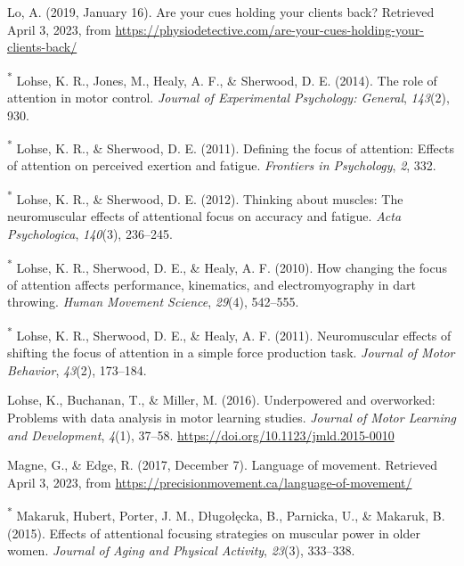 \documentclass[
  man, donotrepeattitle,floatsintext]{apa7}
\newlength{\cslhangindent}
\newlength{\cslentryspacingunit} %
\newenvironment{CSLReferences}[2] %
 {%
  \setlength{\parindent}{0pt}
  \ifodd #1
  \let\oldpar\par
  \def\par{\hangindent=\cslhangindent\oldpar}
  \fi
  \setlength{\parskip}{#2\cslentryspacingunit}
 }%
 {}
\begin{document}
\begin{CSLReferences}{1}{0}
\leavevmode{}%
Lo, A. (2019, January 16). Are your cues holding your clients back? Retrieved April 3, 2023, from \url{https://physiodetective.com/are-your-cues-holding-your-clients-back/}

\leavevmode{}%
\textsuperscript{*} Lohse, K. R., Jones, M., Healy, A. F., \& Sherwood, D. E. (2014). The role of attention in motor control. \emph{Journal of Experimental Psychology: General}, \emph{143}(2), 930.

\leavevmode{}%
\textsuperscript{*} Lohse, K. R., \& Sherwood, D. E. (2011). Defining the focus of attention: Effects of attention on perceived exertion and fatigue. \emph{Frontiers in Psychology}, \emph{2}, 332.

\leavevmode{}%
\textsuperscript{*} Lohse, K. R., \& Sherwood, D. E. (2012). Thinking about muscles: The neuromuscular effects of attentional focus on accuracy and fatigue. \emph{Acta Psychologica}, \emph{140}(3), 236--245.

\leavevmode{}%
\textsuperscript{*} Lohse, K. R., Sherwood, D. E., \& Healy, A. F. (2010). How changing the focus of attention affects performance, kinematics, and electromyography in dart throwing. \emph{Human Movement Science}, \emph{29}(4), 542--555.

\leavevmode{}%
\textsuperscript{*} Lohse, K. R., Sherwood, D. E., \& Healy, A. F. (2011). Neuromuscular effects of shifting the focus of attention in a simple force production task. \emph{Journal of Motor Behavior}, \emph{43}(2), 173--184.

\leavevmode{}%
Lohse, K., Buchanan, T., \& Miller, M. (2016). Underpowered and overworked: {Problems} with data analysis in motor learning studies. \emph{Journal of Motor Learning and Development}, \emph{4}(1), 37--58. \url{https://doi.org/10.1123/jmld.2015-0010}

\leavevmode{}%
Magne, G., \& Edge, R. (2017, December 7). Language of movement. Retrieved April 3, 2023, from \url{https://precisionmovement.ca/language-of-movement/}

\leavevmode{}%
\textsuperscript{*} Makaruk, Hubert, Porter, J. M., Długołęcka, B., Parnicka, U., \& Makaruk, B. (2015). Effects of attentional focusing strategies on muscular power in older women. \emph{Journal of Aging and Physical Activity}, \emph{23}(3), 333--338.


\end{CSLReferences}
\end{document}
